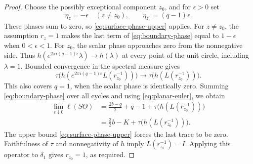 \begin{proof}
Choose the possibly exceptional component $z_0$, and for $\epsilon>0$
set
\[
 \eta_z=-\epsilon\quad(z\ne z_0),\qquad
 \eta_{z_0}=(q-1)\epsilon.
\]
These phases sum to zero, so \eqref{eq:surface-phase-upper} applies.
For $z\ne z_0$, the assumption $r_z=1$ makes the last term of
\eqref{eq:boundary-phase} equal to $1-\epsilon$ when $0<\epsilon<1$.
For $z_0$, the scalar phase approaches zero from the nonnegative side.
Thus $h(e^{2\pi i(q-1)\epsilon}\lambda)\to h(\lambda)$ at every point
of the unit circle, including $\lambda=1$.  Bounded convergence in the
spectral measure gives
\[
 \tau\bigl(h(e^{2\pi i(q-1)\epsilon}L(r_{z_0}^{-1}))\bigr)
 \longrightarrow \tau\bigl(h(L(r_{z_0}^{-1}))\bigr).
\]
This also covers $q=1$, when the scalar phase is identically zero.
Summing \eqref{eq:boundary-phase} over all cycles and using
\eqref{eq:planar-euler}, we obtain
\begin{align*}
 \lim_{\epsilon\downarrow0}\ell(S\Theta)
 &=\frac{2b-q}{2}+q-1+\tau\bigl(h(L(r_{z_0}^{-1}))\bigr)\\
 &=\frac32 b-K+\tau\bigl(h(L(r_{z_0}^{-1}))\bigr).
\end{align*}
The upper bound \eqref{eq:surface-phase-upper} forces the last trace to
be zero.  Faithfulness of $\tau$ and nonnegativity of $h$ imply
$L(r_{z_0}^{-1})=I$.  Applying this operator to $\delta_1$ gives
$r_{z_0}=1$, as required.
\end{proof}
